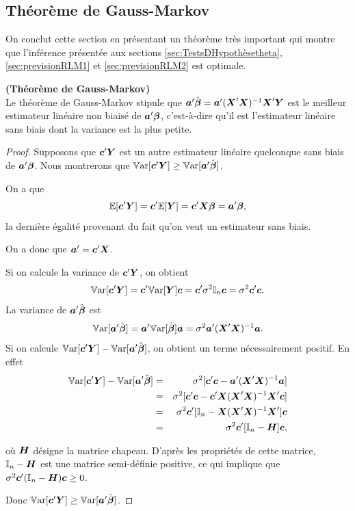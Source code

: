 \newpage
\subsection{Théorème de Gauss-Markov}
\label{sec:ThéorèmeDeGaussMarkov}


On conclut cette section en présentant un théorème très important qui montre que l'inférence présentée aux sections \ref{sec:TestsDHypothèsetheta}, \ref{sec:previsionRLM1} et \ref{sec:previsionRLM2} est optimale.

\begin{theorem}\textbf{(Théorème de Gauss-Markov)}\\
Le théorème de Gauss-Markov stipule que $\bo a'\hbobeta = \bo a'(\boX'\boX)^{-1}\boX'\boY$ est le meilleur estimateur linéaire non biaisé de $\bo a'\bobeta$, c'est-à-dire qu'il est l'estimateur linéaire sans biais dont la variance est la plus petite.
\end{theorem}


\begin{proof}
Supposons que $\bo c'\boY$ est un autre estimateur linéaire quelconque sans biais de $\bo a'\bobeta$. Nous montrerons que $\var[\bo c'\bo Y] \geq \var[\bo a'\hbobeta]$.

On a que
	\[ \esp[\bo c'\boY] = \bo c'\esp[\boY]=\bo c'\boX\bobeta=\bo a'\bobeta,
\]
la dernière égalité provenant du fait qu'on veut un estimateur sans biais.

On a donc que $\bo a'=\bo c'\boX$.

Si on calcule la variance de $\bo c'\boY$, on obtient
	\[\var[\bo c'\boY]=\bo c'\var[\boY]\bo c = \bo c' \sigma^2 \I_n \bo c = \sigma^2 \bo c' \bo c.
\]
La variance de $\bo a'\hbobeta$ est
	\[\var[\bo a'\hbobeta] = \bo a'\var[\hbobeta]\bo a = \sigma^2 \bo a'(\boX'\boX)^{-1}\bo a.
\]
Si on calcule $\var[\bo c'\boY]-\var[\bo a'\hbobeta]$, on obtient un terme nécessairement positif. En effet
\begin{eqnarray*}
	\var[\bo c'\boY]-\var[\bo a'\hbobeta] &=& \sigma^2 [\bo c'\bo c-\bo a'(\boX'\boX)^{-1}\bo a]\\
	&=& \sigma^2[\bo c'\bo c-\bo c'\boX(\boX'\boX)^{-1}\boX'\bo c]\\
	&=& \sigma^2\bo c'[\I_n-\boX(\boX'\boX)^{-1}\boX']\bo c\\
	&=& \sigma^2\bo c'[\I_n-\bo H]\bo c,
\end{eqnarray*}

où $\bo H$ désigne la matrice chapeau. D'après les propriétés de cette matrice, $\I_n-\bo H$ est une matrice semi-définie positive, ce qui implique que $\sigma^2\bo c'(\I_n-\bo H)\bo c \geq 0$.

Donc $\var[\bo c'\boY] \geq \var[\bo a'\hbobeta]$.
\end{proof}


